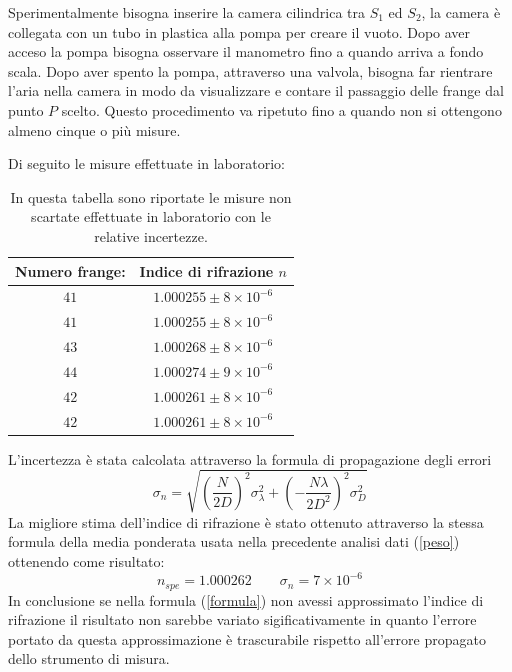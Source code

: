 \documentclass[11pt]{article}
\begin{document}
Sperimentalmente bisogna inserire la camera cilindrica tra $S_1$ ed $S_2$, la camera è collegata con un tubo in plastica alla pompa per creare il vuoto. Dopo aver acceso la pompa bisogna osservare il manometro fino a quando arriva a fondo scala. Dopo aver spento la pompa, attraverso una valvola, bisogna far rientrare l'aria nella camera in modo da visualizzare e contare il passaggio delle frange dal punto $P$ scelto. Questo procedimento va ripetuto fino a quando non si ottengono almeno cinque o più misure.

Di seguito le misure effettuate in laboratorio:
\begin{table}[H]
    \centering
    \begin{tabular}{|c|c|}
    \hline
     Numero frange:  & Indice di rifrazione $n$  \\
    \hline
    $41$ & $ 1.000255 \pm 8 \times 10^{-6}$  \\
    \hline
    $41$ & $ 1.000255 \pm 8 \times 10^{-6}$  \\
    \hline
    $43$ & $ 1.000268\pm 8 \times 10^{-6}$  \\
    \hline
    $44$ & $ 1.000274\pm 9 \times 10^{-6}$  \\
    \hline
    $42$ & $ 1.000261\pm 8 \times 10^{-6}$  \\
    \hline
    $42$ & $ 1.000261\pm 8 \times 10^{-6}$  \\
    \hline
    \end{tabular}
    \caption{In questa tabella sono riportate le misure non scartate effettuate in laboratorio con le relative incertezze.}
    \label{Indice di rifrazione}
\end{table}
L'incertezza è stata calcolata attraverso la formula di propagazione degli errori
\begin{equation}
    \sigma_n=\sqrt{\left(\frac{N}{2D}\right)^2 \sigma_\lambda^2 + \left(-\frac{N\lambda}{2D^2}\right)^2 \sigma_D^2}
\end{equation}
La migliore stima dell'indice di rifrazione è stato ottenuto attraverso la stessa formula della media ponderata usata nella precedente analisi dati (\ref{peso}) ottenendo come risultato:
\begin{equation}
    \nonumber
    n_{spe}=1.000262 \qquad \sigma_n = 7 \times 10^{-6}
\end{equation}
In conclusione se nella formula (\ref{formula}) non avessi approssimato l'indice di rifrazione il risultato non sarebbe variato sigificativamente in quanto l'errore portato da questa approssimazione è trascurabile rispetto all'errore propagato dello strumento di misura.
\newpage
\end{document}
